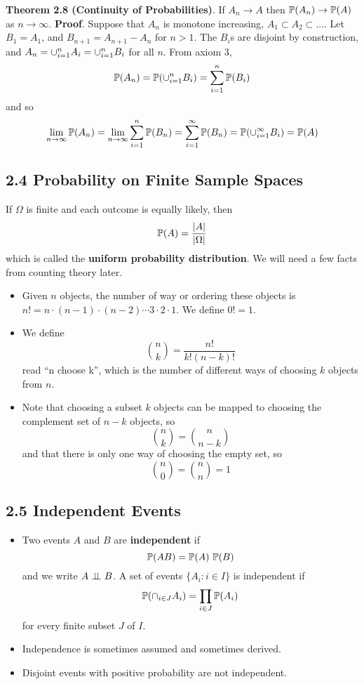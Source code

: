 \textbf{Theorem 2.8 (Continuity of Probabilities)}. If
\(A_{n} \rightarrow A\) then \(\operatorname{\mathbb{P}}(A_{n}) \rightarrow \operatorname{\mathbb{P}}(A)\)
as \(n \rightarrow \infty\).
\textbf{Proof}. Suppose that \(A_{n}\) is monotone increasing,
\(A_{1} \subset A_{2} \subset \dots\). Let \(B_{1} = A_{1}\), and
\(B_{n+1} = A_{n+1} - A_{n}\) for \(n > 1\). The \(B_{i}\)s are disjoint by
construction, and \(A_{n} = \cup_{i=1}^{n} A_{i} = \cup_{i=1}^{n} B_{i}\) for all
\(n\). From axiom 3,
\[
\PROB(A_{n}) = \PROB\left( \union_{i=1}^{n} B_{i} \right)  = \sum_{i=1}^{n} \PROB(B_{i})
\]
and so
\[
\lim_{n \rightarrow \infty} \PROB(A_{n}) = \lim_{n \rightarrow \infty} \sum_{i=1}^{n} \PROB(B_{n}) = \sum_{i=1}^{\infty} \PROB(B_{n}) = \PROB\left( \union_{i=1}^{\infty} B_{i} \right) = \PROB(A)
\]

\subsection*{2.4 Probability on Finite Sample Spaces}\label{probability:samples}
If \(\Omega\) is finite and each outcome is equally likely, then
\[
\operatorname{\mathbb{P}}(A) = \frac{|A|}{|\Omega|}
\]
which is called the \textbf{uniform probability distribution}.
We will need a few facts from counting theory later.
\begin{itemize}
\item
  Given \(n\) objects, the number of way or ordering these objects is
  \(n! = n \cdot (n - 1) \cdot (n - 2) \cdots 3 \cdot 2 \cdot 1\). We
  define \(0! = 1\).
\item
  We define
  \[
\binom{n}{k} = \frac{n!}{k! (n - k)!}
\]
  read ``n choose k'', which is the number of different ways of choosing
  \(k\) objects from \(n\).
\item
  Note that choosing a subset \(k\) objects can be mapped to choosing
  the complement set of \(n - k\) objects, so
  \[
\binom{n}{k} = \binom{n}{n - k}
\]
  and that there is only one way of choosing the empty set, so
  \[
\binom{n}{0} = \binom{n}{n} = 1
\]
\end{itemize}

\subsection*{2.5 Independent Events}\label{independent:events}
\begin{itemize}
\item
  Two events \(A\) and \(B\) are \textbf{independent} if
  \[
\operatorname{\mathbb{P}}(AB) = \operatorname{\mathbb{P}}(A) \, \operatorname{\mathbb{P}}(B)
\]
  and we write \(A \perp\!\!\!\perp B\). A set of events
  \(\{ A_{i} : i \in I \}\) is independent if
  \[
\PROB \left( \inter_{i \in J} A_{i} \right) = \prod_{i \in J} \PROB(A_{i})
\]
  for every finite subset \(J\) of \(I\).
\item
  Independence is sometimes assumed and sometimes derived.
\item
  Disjoint events with positive probability are not independent.
\end{itemize}

